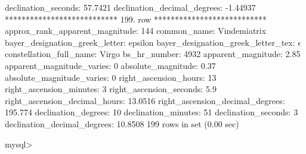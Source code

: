                declination_seconds: 57.7421
       declination_decimal_degrees: -1.44937
*************************** 199. row ***************************
    approx_rank_apparent_magnitude: 144
                       common_name: Vindemiatrix
    bayer_designation_greek_letter: epsilon
bayer_designation_greek_letter_tex: $\epsilon$
           constellation_full_name: Virgo
                      bs_hr_number: 4932
                apparent_magnitude: 2.85
         apparent_magnitude_varies: 0
                absolute_magnitude: 0.37
         absolute_magnitude_varies: 0
             right_ascension_hours: 13
           right_ascension_minutes: 3
           right_ascension_seconds: 5.9
     right_ascension_decimal_hours: 13.0516
   right_ascension_decimal_degrees: 195.774
               declination_degrees: 10
               declination_minutes: 51
               declination_seconds: 3
       declination_decimal_degrees: 10.8508
199 rows in set (0.00 sec)

mysql> 
